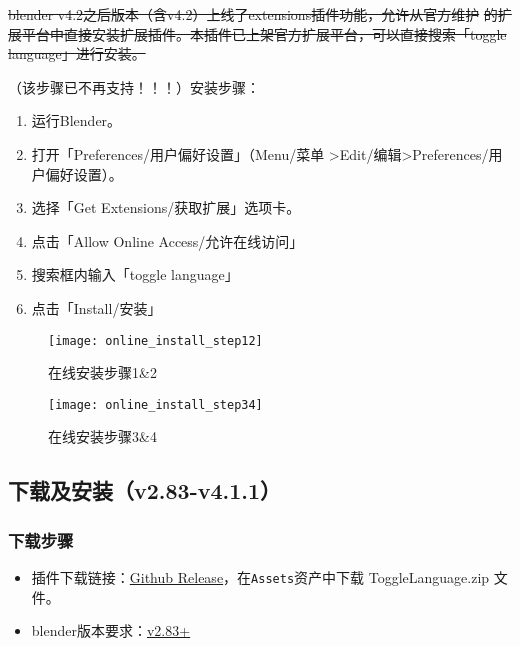 \documentclass{../../public_resources/doc}
\begin{document}
\sout{blender v4.2之后版本（含v4.2）上线了extensions插件功能，允许从官方维护}
\noindent\sout{的扩展平台中直接安装扩展插件。本插件已上架官方扩展平台，可以直接搜索「toggle language」进行安装。}

\noindent （该步骤已不再支持！！！）安装步骤：
\begin{enumerate}
    \item 运行Blender。
    \item 打开「Preferences/用户偏好设置」（Menu/菜单 >Edit/编辑>Preferences/用户偏好设置）。
    \item 选择「Get Extensions/获取扩展」选项卡。
    \item 点击「Allow Online Access/允许在线访问」
    \item 搜索框内输入「toggle language」
    \item 点击「Install/安装」
\end{enumerate}

\begin{figure}[h!]
    \begin{minipage}[t]{0.48\linewidth}
        \texttt{[image: online\_install\_step12]}
        \caption{在线安装步骤1\&2}
    \end{minipage}
    \quad
    \begin{minipage}[t]{0.48\linewidth}
        \texttt{[image: online\_install\_step34]}
        \caption{在线安装步骤3\&4}
    \end{minipage}
\end{figure}

\subsection{下载及安装（v2.83-v4.1.1）}
\hypertarget{install_v283_v411}{}
\subsubsection{下载步骤}
\begin{itemize}
    \item 插件下载链接：\href{https://github.com/Mister-Kin/ToggleLanguage/releases/latest}{Github Release}，在\lstinline|Assets|资产中下载 ToggleLanguage.zip 文件。
    \item blender版本要求：\href{https://www.blender.org/download/}{v2.83+}
\end{itemize}
\end{document}
